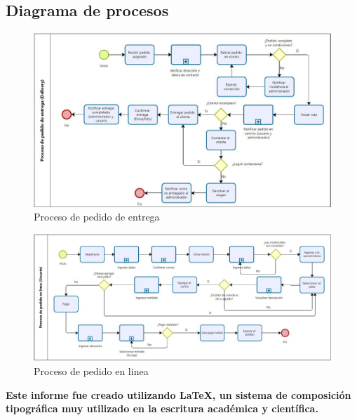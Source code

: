 \documentclass{article}
\begin{document}
\begin{doublespace}
    \section{Diagrama de procesos}
    \begin{itemize}
        \begin{figure}[H]
            \centering
            \vspace*{1cm}
            \includegraphics[width=14cm]{Diagrama de Procesos/Proceso de pedido de entrega.jpg}
            \caption{Proceso de pedido de entrega}
            \label{fig:proceso-pedido-de-entrega}
        \end{figure}

        \begin{figure}[H]
            \centering
            \vspace*{1cm}
            \includegraphics[width=14cm]{Diagrama de Procesos/Proceso de pedido en linea.jpg}
            \caption{Proceso de pedido en linea}
            \label{fig:proceso-pedido-en-linea}
        \end{figure}
    \end{itemize}

    \begin{center}
        \textbf{Este informe fue creado utilizando \LaTeX, un sistema de composición tipográfica muy utilizado en la escritura académica y científica.}
    \end{center}

\end{doublespace}
\end{document}
